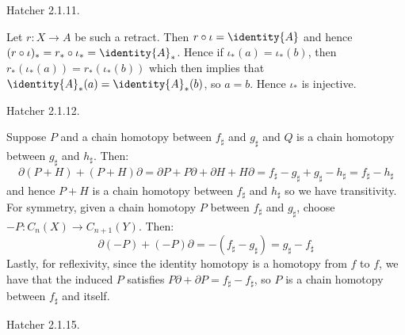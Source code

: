 \documentclass{article}                                                        %
\begin{document}
    \begin{problem}
        Hatcher 2.1.11.
    \end{problem}
    \begin{solution}
        Let $r:X\rightarrow{A}$ be such a retract. Then
        $r\circ\iota=\identity{A}$ and hence
        $(r\circ\iota)_{*}=r_{*}\circ\iota_{*}={\identity{A}}_{*}$. Hence if
        $\iota_{*}(a)=\iota_{*}(b)$, then
        $r_{*}(\iota_{*}(a))=r_{*}(\iota_{*}(b))$ which then implies that
        ${\identity{A}}_{*}(a)={\identity{A}}_{*}(b)$, so $a=b$. Hence
        $\iota_{*}$ is injective.
    \end{solution}
    \begin{problem}
        Hatcher 2.1.12.
    \end{problem}
    \begin{solution}
        Suppose $P$ and a chain homotopy between $f_{\sharp}$ and $g_{\sharp}$
        and $Q$ is a chain homotopy between $g_{\sharp}$ and $h_{\sharp}$.
        Then:
        \begin{equation}
            \partial(P+H)+(P+H)\partial
            =\partial{P}+P\partial+\partial{H}+H\partial
            =f_{\sharp}-g_{\sharp}+g_{\sharp}-h_{\sharp}
            =f_{\sharp}-h_{\sharp}
        \end{equation}
        and hence $P+H$ is a chain homotopy between $f_{\sharp}$ and
        $h_{\sharp}$ so we have transitivity. For symmetry, given a chain
        homotopy $P$ between $f_{\sharp}$ and $g_{\sharp}$, choose
        $\minus{P}:C_{n}(X)\rightarrow{C}_{n+1}(Y)$. Then:
        \begin{equation}
            \partial(\minus{P})+(\minus{P})\partial
            =\minus(f_{\sharp}-g_{\sharp})=g_{\sharp}-f_{\sharp}
        \end{equation}
        Lastly, for reflexivity, since the identity homotopy is a homotopy from
        $f$ to $f$, we have that the induced $P$ satisfies
        $P\partial+\partial{P}=f_{\sharp}-f_{\sharp}$, so $P$ is a chain
        homotopy between $f_{\sharp}$ and itself.
    \end{solution}
    \begin{problem}
        Hatcher 2.1.15.
    \end{problem}
\end{document}
